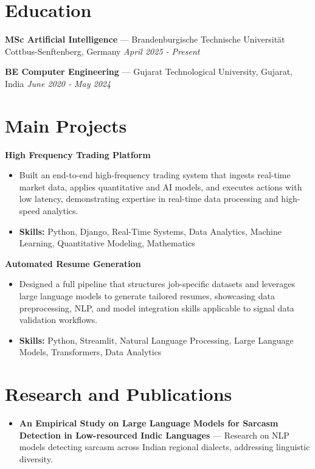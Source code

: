 \documentclass[a4paper,10pt]{article}
\begin{document}
\section*{Education}
\textbf{MSc Artificial Intelligence} — Brandenburgische Technische Universität Cottbus-Senftenberg, Germany \hfill \textit{April 2025 - Present}\par
\vspace{1.5pt}
\textbf{BE Computer Engineering} — Gujarat Technological University, Gujarat, India \hfill \textit{June 2020 - May 2024}\par

\section*{Main Projects}
\textbf{High Frequency Trading Platform}\par
\vspace{1pt}
\begin{itemize}
  \item Built an end-to-end high-frequency trading system that ingests real-time market data, applies quantitative and AI models, and executes actions with low latency, demonstrating expertise in real-time data processing and high-speed analytics.
  \item \textbf{Skills:} Python, Django, Real-Time Systems, Data Analytics, Machine Learning, Quantitative Modeling, Mathematics
\end{itemize}
\vspace{3pt}
\textbf{Automated Resume Generation}\par
\vspace{1pt}
\begin{itemize}
  \item Designed a full pipeline that structures job-specific datasets and leverages large language models to generate tailored resumes, showcasing data preprocessing, NLP, and model integration skills applicable to signal data validation workflows.
  \item \textbf{Skills:} Python, Streamlit, Natural Language Processing, Large Language Models, Transformers, Data Analytics
\end{itemize}

\section*{Research and Publications}
\begin{itemize}
\item \textbf{An Empirical Study on Large Language Models for Sarcasm Detection in Low-resourced Indic Languages} — Research on NLP models detecting sarcasm across Indian regional dialects, addressing linguistic diversity.
\end{itemize}
\end{document}

